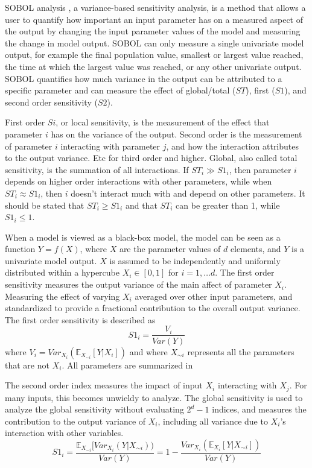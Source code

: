 SOBOL analysis \cite{sobolGlobalSensitivityIndices2001}, a variance-based sensitivity analysis, is a method that allows a user to quantify how important an input parameter has on a measured aspect of the output by changing the input parameter values of the model and measuring the change in model output.
SOBOL can only measure a single univariate model output, for example the final population value, smallest or largest value reached, the time at which the largest value was reached, or any other univariate output. 
SOBOL quantifies how much variance in the output can be attributed to a specific parameter and can measure the effect of global/total ($ST$), first ($S1$), and second order sensitivity ($S2$). 

First order $Si$, or local sensitivity, is the measurement of the effect that parameter $i$ has on the variance of the output. 
Second order is the measurement of parameter $i$ interacting with parameter $j$, and how the interaction attributes to the output variance. 
Etc for third order and higher. 
Global, also called total sensitivity, is the summation of all interactions. 
If $ST_i \gg S1_i$, then parameter $i$ depends on higher order interactions with other parameters, while when $ST_i \approx S1_i$, then $i$ doesn't interact much with and depend on other parameters.
It should be stated that $ST_i \geq S1_i$ and that $ST_i$ can be greater than 1, while $S1_i \leq 1$. 

When a model is viewed as a black-box model, the model can be seen as a function $Y=f(X)$, where $X$ are the parameter values of $d$ elements, and $Y$ is a univariate model output.
$X$ is assumed to be independently and uniformly distributed within a hypercube $X_i \in [0, 1]$ for $i=1, \dots d$.
The first order sensitivity measures the output variance of the main affect of parameter $X_i$.
Measuring the effect of varying $X_i$ averaged over other input parameters, and standardized to provide a fractional contribution to the overall output variance.
The first order sensitivity is described as
\[
    S1_i = \frac{V_i}{\textit{Var}(Y)}
\] where $V_i = \textit{Var}_{X_i}(\mathbb{E}_{X_{\sim i}}[Y|X_i])$ and where $X_{\sim i}$ represents all the parameters that are not $X_i$.
All parameters are summarized in 

The second order index measures the impact of input $X_i$ interacting with $X_j$. For many inputs, this becomes unwieldy to analyze.
The global sensitivity is used to analyze the global sensitivity without evaluating $2^d-1$ indices, and measures the contribution to the output variance of $X_i$, including all variance due to $X_i$'s interaction with other variables.
\[
    S1_i = \frac{\mathbb{E}_{X_{\sim i}}[\textit{Var}_{X_i}(Y|X_{\sim i}))}{\textit{Var}(Y)} = 1 - \frac{\textit{Var}_{X_i}(\mathbb{E}_{X_i}[Y|X_{\sim i}])}{\textit{Var}(Y)}
\]

